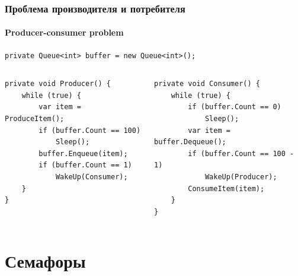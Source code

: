 \documentclass[xetex,mathserif,serif]{beamer}
\begin{document}
    \begin{frame}[fragile]
        \frametitle{Проблема производителя и потребителя}
        \framesubtitle{Producer-consumer problem}
        \begin{footnotesize}
            \begin{verbatim}
private Queue<int> buffer = new Queue<int>();
            \end{verbatim}
            \begin{columns}
                \begin{column}{0.5\textwidth}
                    \begin{verbatim}
private void Producer() {
    while (true) {
        var item = ProduceItem();
        if (buffer.Count == 100)
            Sleep();
        buffer.Enqueue(item);
        if (buffer.Count == 1)
            WakeUp(Consumer);
    }
}
                    \end{verbatim}
                \end{column}
                \begin{column}{0.5\textwidth}
                    \begin{verbatim}
private void Consumer() {
    while (true) {
        if (buffer.Count == 0)
            Sleep();
        var item = buffer.Dequeue();
        if (buffer.Count == 100 - 1)
            WakeUp(Producer);
        ConsumeItem(item);
    }
}
                    \end{verbatim}
                \end{column}
            \end{columns}
        \end{footnotesize}
    \end{frame}

    \section{Семафоры}
\end{document}
